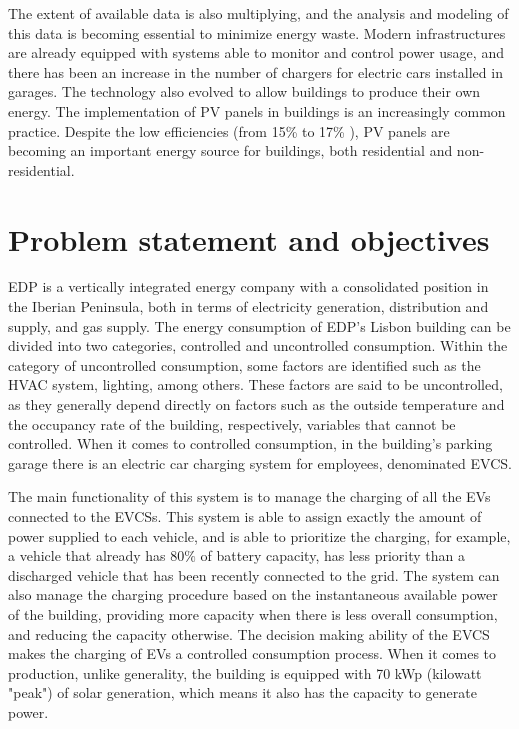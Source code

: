 The extent of available data is also multiplying, and the analysis and modeling of this data is becoming essential to minimize energy waste. Modern infrastructures are already equipped with systems able to monitor and control power usage, and there has been an increase in the number of chargers for electric cars installed in garages. The technology also evolved to allow buildings to produce their own energy. The implementation of \ac{PV} panels in buildings is an increasingly common practice. Despite the low efficiencies (from 15\% to 17\% \cite{pv}), \ac{PV} panels are becoming an important energy source for buildings, both  residential and non-residential. 









\section{Problem statement and objectives}


\ac{EDP} is a vertically integrated energy company with a consolidated position in the Iberian Peninsula, both in terms of electricity generation, distribution and supply, and gas supply. The energy consumption of \ac{EDP}'s Lisbon building can be divided into two categories, controlled and uncontrolled consumption. Within the category of uncontrolled consumption, some factors are identified such as the \ac{HVAC} system, lighting, among others. These factors are said to be uncontrolled, as they generally depend directly on factors such as the outside temperature and the occupancy rate of the building, respectively, variables that cannot be controlled. When it comes to controlled consumption, in the building's parking garage there is an electric car charging system for employees, denominated \ac{EVCS}. 

The main functionality of this system is to manage the charging of all the \ac{EV}s connected to the \ac{EVCSs}. This system is able to assign exactly the amount of power supplied to each vehicle, and is able to prioritize the charging, for example, a vehicle that already has 80$\%$ of battery capacity, has less priority than a discharged vehicle that has been recently connected to the grid. The system can also manage the charging procedure based on the instantaneous available power of the building, providing more capacity when there is less overall consumption, and reducing the capacity otherwise. The decision making ability of the \ac{EVCS} makes the charging of \ac{EV}s a controlled consumption process. When it comes to production, unlike generality, the building is equipped with 70 kWp (kilowatt "peak") of solar generation, which means it also has the capacity to generate power. 



